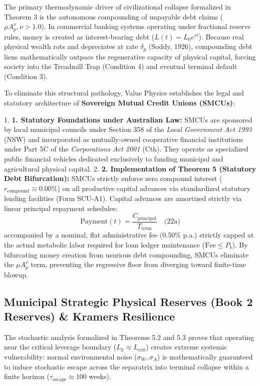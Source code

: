 \documentclass[preprint,12pt,authoryear]{elsarticle}
\theoremstyle{definition}
\begin{document}
The primary thermodynamic driver of civilizational collapse formalized in Theorem 3 is the autonomous compounding of unpayable debt claims ($\mu A_p^\nu, \nu > 1.0$). In commercial banking systems operating under fractional reserve rules, money is created as interest-bearing debt ($L(t) = L_0 e^{rt}$). Because real physical wealth rots and depreciates at rate $\delta_p$ (Soddy, 1926), compounding debt liens mathematically outpace the regenerative capacity of physical capital, forcing society into the Treadmill Trap (Condition 4) and eventual terminal default (Condition 3).

To eliminate this structural pathology, Value Physics establishes the legal and statutory architecture of \textbf{Sovereign Mutual Credit Unions (SMCUs)}:

1.  \textbf{1. Statutory Foundations under Australian Law:} SMCUs are sponsored by local municipal councils under Section 358 of the \textit{Local Government Act 1993} (NSW) and incorporated as mutually-owned cooperative financial institutions under Part 5C of the \textit{Corporations Act 2001} (Cth). They operate as specialized public financial vehicles dedicated exclusively to funding municipal and agricultural physical capital.
2.  \textbf{2. Implementation of Theorem 5 (Statutory Debt Bifurcation):} SMCUs strictly enforce zero compound interest ($r_{\text{compound}} \equiv 0.00\%$) on all productive capital advances via standardized statutory lending facilities (Form SCU-A1). Capital advances are amortized strictly via linear principal repayment schedules: $$\text{Payment}(t) = \frac{C_{\text{principal}}}{T_{\text{term}}} \quad \text{(22a)}$$ accompanied by a nominal, flat administrative fee (0.50\% p.a.) strictly capped at the actual metabolic labor required for loan ledger maintenance ($\text{Fee} \le P_b$). By bifurcating money creation from usurious debt compounding, SMCUs eliminate the $\mu A_p^\nu$ term, preventing the regressive floor from diverging toward finite-time blowup.

\subsection{Municipal Strategic Physical Reserves (Book 2 Reserves) \& Kramers Resilience}

The stochastic analysis formalized in Theorems 5.2 and 5.3 proves that operating near the critical leverage boundary ($L_k \approx L_{\text{crit}}$) creates extreme systemic vulnerability: normal environmental noise ($\sigma_W, \sigma_A$) is mathematically guaranteed to induce stochastic escape across the separatrix into terminal collapse within a finite horizon ($\tau_{\text{escape}} \approx 100$ weeks).
\end{document}
